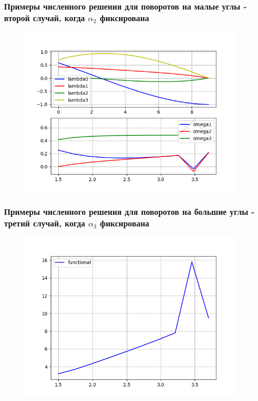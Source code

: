 \documentclass[10pt,utf8,presentation,notheorems,xcolor=dvipsnames,compress]{beamer}
\begin{document}
\begin{frame}
\frametitle{Примеры численного решения для поворотов на малые углы - второй случай, когда $\alpha_2$ фиксирована}
\begin{figure}[H]\label{one}
\center\includegraphics[scale=0.5]{fig/ivp_and_control_1_5-3_7_50.png}
\caption{}
\end{figure}
\end{frame}

\begin{frame}
\frametitle{Примеры численного решения для поворотов на большие углы - третий случай, когда $\alpha_3$ фиксирована}
\begin{figure}[H]\label{one}
\center\includegraphics[scale=0.5]{fig/functional_1_5-3_7_50.png}
\caption{}
\end{figure}
\end{frame}
\end{document}
